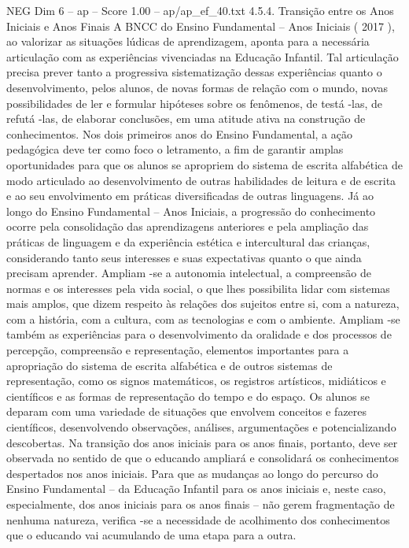 \begin{textsample}{NEG Dim 6 – ap – Score 1.00 – ap/ap\_ef\_40.txt}  \label{ex:f6_neg_189}
4.5.4.
Transição entre os Anos Iniciais e Anos Finais A BNCC do Ensino Fundamental – Anos Iniciais ( 2017 ), ao valorizar as situações lúdicas de aprendizagem, aponta para a necessária articulação com as experiências vivenciadas na Educação Infantil.
Tal articulação precisa prever tanto a progressiva sistematização dessas experiências quanto o desenvolvimento, pelos alunos, de novas formas de relação com o mundo, novas possibilidades de ler e formular hipóteses sobre os fenômenos, de testá -las, de refutá -las, de elaborar conclusões, em uma atitude ativa na construção de conhecimentos.
Nos dois primeiros anos do Ensino Fundamental, a ação pedagógica deve ter como foco o letramento, a fim de garantir amplas oportunidades para que os alunos se apropriem do sistema de escrita alfabética de modo articulado ao desenvolvimento de outras habilidades de leitura e de escrita e ao seu envolvimento em práticas diversificadas de outras linguagens.
Já ao longo do Ensino Fundamental – Anos Iniciais, a progressão do conhecimento ocorre pela consolidação das aprendizagens anteriores e pela ampliação das práticas de linguagem e da experiência estética e intercultural das crianças, considerando tanto seus interesses e suas expectativas quanto o que ainda precisam aprender.
Ampliam -se a autonomia intelectual, a compreensão de normas e os interesses pela vida social, o que lhes possibilita lidar com sistemas mais amplos, que dizem respeito às relações dos sujeitos entre si, com a natureza, com a história, com a cultura, com as tecnologias e com o ambiente.
Ampliam -se também as experiências para o desenvolvimento da oralidade e dos processos de percepção, compreensão e representação, elementos importantes para a apropriação do sistema de escrita alfabética e de outros sistemas de representação, como os signos matemáticos, os registros artísticos, midiáticos e científicos e as formas de representação do tempo e do espaço.
Os alunos se deparam com uma variedade de situações que envolvem conceitos e fazeres científicos, desenvolvendo observações, análises, argumentações e potencializando descobertas.
Na transição dos anos iniciais para os anos finais, portanto, deve ser observada no sentido de que o educando ampliará e consolidará os conhecimentos despertados nos anos iniciais.
Para que as mudanças ao longo do percurso do Ensino Fundamental – da Educação Infantil para os anos iniciais e, neste caso, especialmente, dos anos iniciais para os anos finais – não gerem fragmentação de nenhuma natureza, verifica -se a necessidade de acolhimento dos conhecimentos que o educando vai acumulando de uma etapa para a outra.

\end{textsample}
